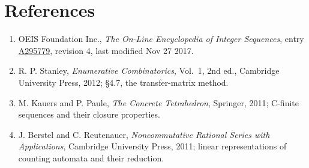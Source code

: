 \documentclass[11pt]{article}
\theoremstyle{definition}
\begin{document}
\section{References}

\begin{enumerate}

\item OEIS Foundation Inc., \emph{The On-Line Encyclopedia of Integer Sequences}, entry \href{https://oeis.org/A295779}{A295779}, revision 4, last modified Nov 27 2017.

\item R. P. Stanley, \emph{Enumerative Combinatorics}, Vol.~1, 2nd ed., Cambridge University Press, 2012; \S4.7, the transfer-matrix method.

\item M. Kauers and P. Paule, \emph{The Concrete Tetrahedron}, Springer, 2011; C-finite sequences and their closure properties.

\item J. Berstel and C. Reutenauer, \emph{Noncommutative Rational Series with Applications}, Cambridge University Press, 2011; linear representations of counting automata and their reduction.

\end{enumerate}
\end{document}
